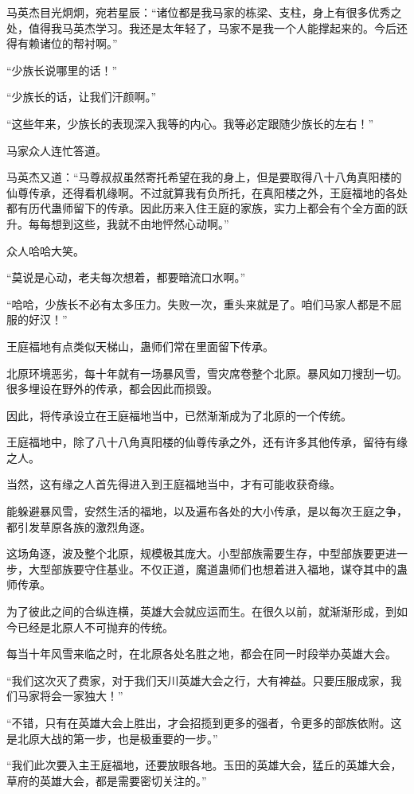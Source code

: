 \begin{this_body}
马英杰目光炯炯，宛若星辰：“诸位都是我马家的栋梁、支柱，身上有很多优秀之处，值得我马英杰学习。我还是太年轻了，马家不是我一个人能撑起来的。今后还得有赖诸位的帮衬啊。”

“少族长说哪里的话！”

“少族长的话，让我们汗颜啊。”

“这些年来，少族长的表现深入我等的内心。我等必定跟随少族长的左右！”

马家众人连忙答道。

马英杰又道：“马尊叔叔虽然寄托希望在我的身上，但是要取得八十八角真阳楼的仙尊传承，还得看机缘啊。不过就算我有负所托，在真阳楼之外，王庭福地的各处都有历代蛊师留下的传承。因此历来入住王庭的家族，实力上都会有个全方面的跃升。每每想到这些，我就不由地怦然心动啊。”

众人哈哈大笑。

“莫说是心动，老夫每次想着，都要暗流口水啊。”

“哈哈，少族长不必有太多压力。失败一次，重头来就是了。咱们马家人都是不屈服的好汉！”

王庭福地有点类似天梯山，蛊师们常在里面留下传承。

北原环境恶劣，每十年就有一场暴风雪，雪灾席卷整个北原。暴风如刀搜刮一切。很多埋设在野外的传承，都会因此而损毁。

因此，将传承设立在王庭福地当中，已然渐渐成为了北原的一个传统。

王庭福地中，除了八十八角真阳楼的仙尊传承之外，还有许多其他传承，留待有缘之人。

当然，这有缘之人首先得进入到王庭福地当中，才有可能收获奇缘。

能躲避暴风雪，安然生活的福地，以及遍布各处的大小传承，是以每次王庭之争，都引发草原各族的激烈角逐。

这场角逐，波及整个北原，规模极其庞大。小型部族需要生存，中型部族要更进一步，大型部族要守住基业。不仅正道，魔道蛊师们也想着进入福地，谋夺其中的蛊师传承。

为了彼此之间的合纵连横，英雄大会就应运而生。在很久以前，就渐渐形成，到如今已经是北原人不可抛弃的传统。

每当十年风雪来临之时，在北原各处名胜之地，都会在同一时段举办英雄大会。

“我们这次灭了费家，对于我们天川英雄大会之行，大有裨益。只要压服成家，我们马家将会一家独大！”

“不错，只有在英雄大会上胜出，才会招揽到更多的强者，令更多的部族依附。这是北原大战的第一步，也是极重要的一步。”

“我们此次要入主王庭福地，还要放眼各地。玉田的英雄大会，猛丘的英雄大会，草府的英雄大会，都是需要密切关注的。”


\end{this_body}
